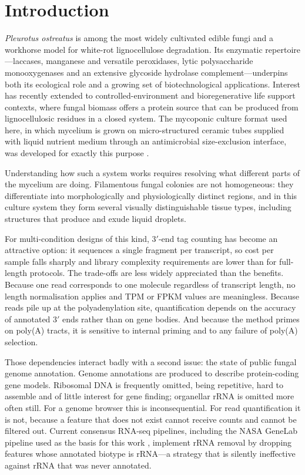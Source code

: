 \section{Introduction}\label{sec:intro}

\textit{Pleurotus ostreatus} is among the most widely cultivated edible fungi and a workhorse
model for white-rot lignocellulose degradation. Its enzymatic repertoire---laccases,
manganese and versatile peroxidases, lytic polysaccharide monooxygenases and an extensive
glycoside hydrolase complement---underpins both its ecological role and a growing set of
biotechnological applications. Interest has recently extended to controlled-environment and
bioregenerative life support contexts, where fungal biomass offers a protein source that can
be produced from lignocellulosic residues in a closed system. The mycoponic culture format
used here, in which mycelium is grown on micro-structured ceramic tubes supplied with liquid
nutrient medium through an antimicrobial size-exclusion interface, was developed for exactly
this purpose \cite{porterfield2026mycoponics}.

Understanding how such a system works requires resolving what different parts of the mycelium
are doing. Filamentous fungal colonies are not homogeneous: they differentiate into
morphologically and physiologically distinct regions, and in this culture system they form
several visually distinguishable tissue types, including structures that produce and exude
liquid droplets.

For multi-condition designs of this kind, 3$'$-end tag counting has become an attractive
option: it sequences a single fragment per transcript, so cost per sample falls sharply and
library complexity requirements are lower than for full-length protocols. The trade-offs are
less widely appreciated than the benefits. Because one read corresponds to one molecule
regardless of transcript length, no length normalisation applies and TPM or FPKM values are
meaningless. Because reads pile up at the polyadenylation site, quantification depends on the
accuracy of annotated 3$'$ ends rather than on gene bodies. And because the method primes on
poly(A) tracts, it is sensitive to internal priming and to any failure of poly(A) selection.

Those dependencies interact badly with a second issue: the state of public fungal genome
annotation. Genome annotations are produced to describe protein-coding gene models. Ribosomal
DNA is frequently omitted, being repetitive, hard to assemble and of little interest for gene
finding; organellar rRNA is omitted more often still. For a genome browser this is
inconsequential. For read quantification it is not, because a feature that does not exist
cannot receive counts and cannot be filtered out. Current consensus RNA-seq pipelines,
including the NASA GeneLab pipeline used as the basis for this work
\cite{genelab7101G}, implement rRNA removal by dropping features whose annotated biotype is
rRNA---a strategy that is silently ineffective against rRNA that was never annotated.

